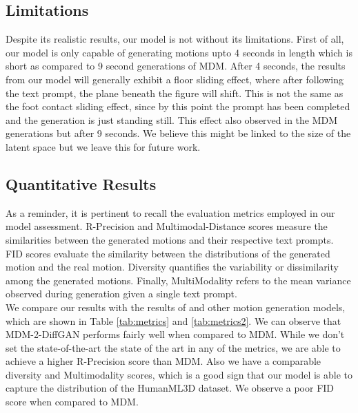\documentclass[10pt,twocolumn,letterpaper]{article}
\begin{document}
\subsection{Limitations}
Despite its realistic results, our model is not without its limitations. First of all, our model is only capable of generating motions
upto 4 seconds in length which is short as compared to 9 second generations of MDM. After 4 seconds, the results from our model will generally exhibit a floor sliding effect, where after following the text prompt, the plane beneath the
figure will shift. This is not the same as the foot contact sliding effect, since by this point the prompt has been completed and the generation is just 
standing still. This effect also observed in the MDM generations but after 9 seconds. We believe this might be linked to the size of the latent space but
we leave this for future work.


\subsection{Quantitative Results}

As a reminder, it is pertinent to recall the evaluation metrics employed in our model assessment. R-Precision and Multimodal-Distance scores measure the similarities 
between the generated motions and their respective text prompts. FID scores evaluate the similarity between the distributions of the generated motion and the real 
motion. Diversity quantifies the variability or dissimilarity among the generated motions. Finally, MultiModality refers to the mean variance observed during 
generation given a single text prompt.
\\

We compare our results with the results of \cite{Tevet23} and other motion generation models, which are shown in Table \ref{tab:metrics} 
and \ref{tab:metrics2}. We can observe that MDM-2-DiffGAN performs fairly well when compared to MDM. While we don't set the state-of-the-art
the state of the art in any of the metrics, we are able to achieve a higher R-Precision score than MDM. Also we have a comparable diversity and Multimodality
scores, which is a good sign that our model is able to capture the distribution of the HumanML3D dataset. We observe a poor FID score when
compared to MDM. 
\end{document}

